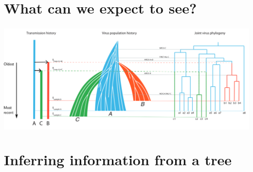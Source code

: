 \documentclass[aspectratio=169]{beamer}
\begin{document}
\section{What can we expect to see?}

\begin{frame} \frametitle{\insertsection}
    \begin{center}
        \centering\includegraphics[width=\textwidth]{images/thomas-figure}
    \end{center}
\end{frame}

\section{Inferring information from a tree}
\end{document}
